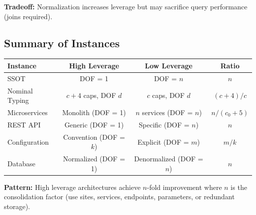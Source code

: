 \textbf{Tradeoff:} Normalization increases leverage but may sacrifice query performance (joins required).

\subsection{Summary of Instances}

\begin{center}
\begin{tabular}{lccc}
\toprule
\textbf{Instance} & \textbf{High Leverage} & \textbf{Low Leverage} & \textbf{Ratio} \\
\midrule
SSOT & DOF = 1 & DOF = $n$ & $n$ \\
Nominal Typing & $c+4$ caps, DOF $d$ & $c$ caps, DOF $d$ & $(c+4)/c$ \\
Microservices & Monolith (DOF = 1) & $n$ services (DOF = $n$) & $n/(c_0+5)$ \\
REST API & Generic (DOF = 1) & Specific (DOF = $n$) & $n$ \\
Configuration & Convention (DOF = $k$) & Explicit (DOF = $m$) & $m/k$ \\
Database & Normalized (DOF = 1) & Denormalized (DOF = $n$) & $n$ \\
\bottomrule
\end{tabular}
\end{center}

\textbf{Pattern:} High leverage architectures achieve $n$-fold improvement where $n$ is the consolidation factor (use sites, services, endpoints, parameters, or redundant storage).
